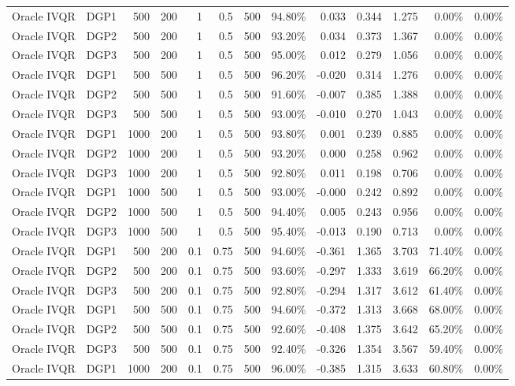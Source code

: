 \begin{landscape}
\begin{longtable}{llrrrrrrrrrrr}
Oracle IVQR & DGP1 & 500 & 200 & 1 & 0.5 & 500 & 94.80\% & 0.033 & 0.344 & 1.275 & 0.00\% & 0.00\% \\
Oracle IVQR & DGP2 & 500 & 200 & 1 & 0.5 & 500 & 93.20\% & 0.034 & 0.373 & 1.367 & 0.00\% & 0.00\% \\
Oracle IVQR & DGP3 & 500 & 200 & 1 & 0.5 & 500 & 95.00\% & 0.012 & 0.279 & 1.056 & 0.00\% & 0.00\% \\
Oracle IVQR & DGP1 & 500 & 500 & 1 & 0.5 & 500 & 96.20\% & -0.020 & 0.314 & 1.276 & 0.00\% & 0.00\% \\
Oracle IVQR & DGP2 & 500 & 500 & 1 & 0.5 & 500 & 91.60\% & -0.007 & 0.385 & 1.388 & 0.00\% & 0.00\% \\
Oracle IVQR & DGP3 & 500 & 500 & 1 & 0.5 & 500 & 93.00\% & -0.010 & 0.270 & 1.043 & 0.00\% & 0.00\% \\
Oracle IVQR & DGP1 & 1000 & 200 & 1 & 0.5 & 500 & 93.80\% & 0.001 & 0.239 & 0.885 & 0.00\% & 0.00\% \\
Oracle IVQR & DGP2 & 1000 & 200 & 1 & 0.5 & 500 & 93.20\% & 0.000 & 0.258 & 0.962 & 0.00\% & 0.00\% \\
Oracle IVQR & DGP3 & 1000 & 200 & 1 & 0.5 & 500 & 92.80\% & 0.011 & 0.198 & 0.706 & 0.00\% & 0.00\% \\
Oracle IVQR & DGP1 & 1000 & 500 & 1 & 0.5 & 500 & 93.00\% & -0.000 & 0.242 & 0.892 & 0.00\% & 0.00\% \\
Oracle IVQR & DGP2 & 1000 & 500 & 1 & 0.5 & 500 & 94.40\% & 0.005 & 0.243 & 0.956 & 0.00\% & 0.00\% \\
Oracle IVQR & DGP3 & 1000 & 500 & 1 & 0.5 & 500 & 95.40\% & -0.013 & 0.190 & 0.713 & 0.00\% & 0.00\% \\
Oracle IVQR & DGP1 & 500 & 200 & 0.1 & 0.75 & 500 & 94.60\% & -0.361 & 1.365 & 3.703 & 71.40\% & 0.00\% \\
Oracle IVQR & DGP2 & 500 & 200 & 0.1 & 0.75 & 500 & 93.60\% & -0.297 & 1.333 & 3.619 & 66.20\% & 0.00\% \\
Oracle IVQR & DGP3 & 500 & 200 & 0.1 & 0.75 & 500 & 92.80\% & -0.294 & 1.317 & 3.612 & 61.40\% & 0.00\% \\
Oracle IVQR & DGP1 & 500 & 500 & 0.1 & 0.75 & 500 & 94.60\% & -0.372 & 1.313 & 3.668 & 68.00\% & 0.00\% \\
Oracle IVQR & DGP2 & 500 & 500 & 0.1 & 0.75 & 500 & 92.60\% & -0.408 & 1.375 & 3.642 & 65.20\% & 0.00\% \\
Oracle IVQR & DGP3 & 500 & 500 & 0.1 & 0.75 & 500 & 92.40\% & -0.326 & 1.354 & 3.567 & 59.40\% & 0.00\% \\
Oracle IVQR & DGP1 & 1000 & 200 & 0.1 & 0.75 & 500 & 96.00\% & -0.385 & 1.315 & 3.633 & 60.80\% & 0.00\% \\

\end{longtable}
\end{landscape}
